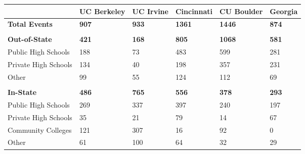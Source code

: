 \begin{longtabu}{X[1.6,l] X[1,c] X[1,c] X[1,c] X[1,c] X[1,c]}%
\textbf{}&\textbf{UC Berkeley}&\textbf{UC Irvine}&\textbf{Cincinnati}&\textbf{CU Boulder}&\textbf{Georgia}\\%
\hline%
\textbf{Total Events}&\textbf{907}&\textbf{933}&\textbf{1361}&\textbf{1446}&\textbf{874}\\%
&&&&&\\%
\textbf{Out{-}of{-}State}&\textbf{421}&\textbf{168}&\textbf{805}&\textbf{1068}&\textbf{581}\\%
\hspace{0.4cm}Public High Schools&188&73&483&599&281\\%
\hspace{0.4cm}Private High Schools&134&40&198&357&231\\%
\hspace{0.4cm}Other&99&55&124&112&69\\%
&&&&&\\%
\textbf{In{-}State}&\textbf{486}&\textbf{765}&\textbf{556}&\textbf{378}&\textbf{293}\\%
\hspace{0.4cm}Public High Schools&269&337&397&240&197\\%
\hspace{0.4cm}Private High Schools&35&21&79&14&67\\%
\hspace{0.4cm}Community Colleges&121&307&16&92&0\\%
\hspace{0.4cm}Other&61&100&64&32&29\\%
\hline%
\end{longtabu}%

